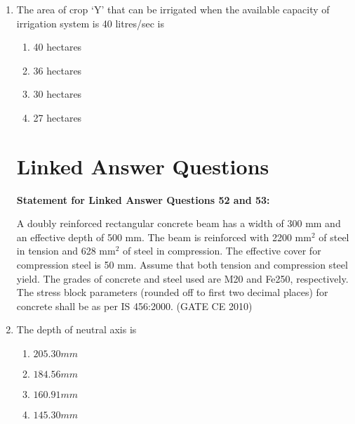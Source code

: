 \documentclass[journal]{IEEEtran}
\begin{document}
\begin{enumerate}
    
    \item The area of crop `Y' that can be irrigated when the available capacity of irrigation system is 40 litres/sec is

    \begin{multicols}{4}
        \begin{enumerate}
            \item 40 hectares
            \item 36 hectares
            \item 30 hectares
            \item 27 hectares
        \end{enumerate}
    \end{multicols}

    \section*{Linked Answer Questions}

    \textbf{Statement for Linked Answer Questions 52 and 53:}

    A doubly reinforced rectangular concrete beam has a width of 300 mm and an effective depth of 500 mm. The beam is reinforced with 2200 mm$^2$ of steel in tension and 628 mm$^2$ of steel in compression. The effective cover for compression steel is 50 mm. Assume that both tension and compression steel yield. The grades of concrete and steel used are M20 and Fe250, respectively. The stress block parameters (rounded off to first two decimal places) for concrete shall be as per IS 456:2000.  \hfill (GATE CE 2010) \\ 

    \item The depth of neutral axis is
    \begin{multicols}{4}
        \begin{enumerate}
            \item $205.30 mm$
            \item $184.56 mm$
            \item $160.91 mm$
            \item $145.30 mm$
        \end{enumerate}
    \end{multicols}

\end{enumerate}
\end{document}
